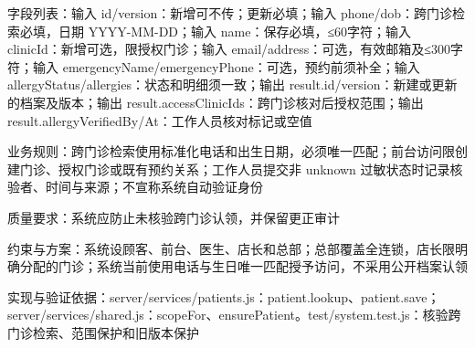 \documentclass[UTF8,12pt,a4paper,fontset=none]{ctexart}
\begin{document}
字段列表：输入 id/\allowbreak{}version：新增可不传；更新必填；输入 phone/\allowbreak{}dob：跨门诊检索必填，日期 YYYY-MM-DD；输入 name：保存必填，≤60字符；输入 clinicId：新增可选，限授权门诊；输入 email/\allowbreak{}address：可选，有效邮箱及≤300字符；输入 emergencyName/\allowbreak{}emergencyPhone：可选，预约前须补全；输入 allergyStatus/\allowbreak{}allergies：状态和明细须一致；输出 result.\allowbreak{}id/\allowbreak{}version：新建或更新的档案及版本；输出 result.\allowbreak{}accessClinicIds：跨门诊核对后授权范围；输出 result.\allowbreak{}allergyVerifiedBy/\allowbreak{}At：工作人员核对标记或空值\par
业务规则：跨门诊检索使用标准化电话和出生日期，必须唯一匹配；前台访问限创建门诊、授权门诊或既有预约关系；工作人员提交非 unknown 过敏状态时记录核验者、时间与来源；不宣称系统自动验证身份\par
质量要求：系统应防止未核验跨门诊认领，并保留更正审计\par
约束与方案：系统设顾客、前台、医生、店长和总部；总部覆盖全连锁，店长限明确分配的门诊；系统当前使用电话与生日唯一匹配授予访问，不采用公开档案认领\par
实现与验证依据：server/\allowbreak{}services/\allowbreak{}patients.\allowbreak{}js：patient.\allowbreak{}lookup、patient.\allowbreak{}save；server/\allowbreak{}services/\allowbreak{}shared.\allowbreak{}js：scopeFor、ensurePatient。test/\allowbreak{}system.\allowbreak{}test.\allowbreak{}js：核验跨门诊检索、范围保护和旧版本保护\par
{}
\end{document}

